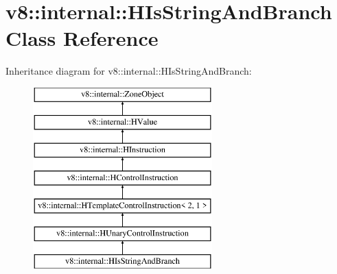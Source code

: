 \hypertarget{classv8_1_1internal_1_1_h_is_string_and_branch}{}\section{v8\+:\+:internal\+:\+:H\+Is\+String\+And\+Branch Class Reference}
\label{classv8_1_1internal_1_1_h_is_string_and_branch}
Inheritance diagram for v8\+:\+:internal\+:\+:H\+Is\+String\+And\+Branch\+:\begin{figure}[H]
\begin{center}
\leavevmode
\includegraphics[height=7.000000cm]{classv8_1_1internal_1_1_h_is_string_and_branch}
\end{center}
\end{figure}
